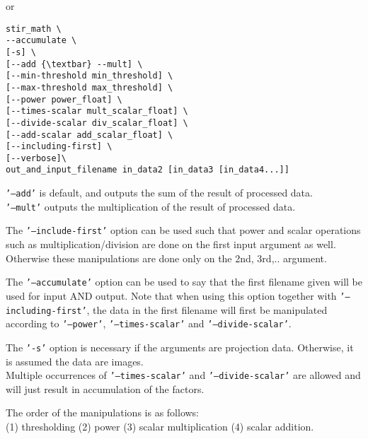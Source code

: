\documentclass{article}
\begin{document}
or

\begin{verbatim}
stir_math \
--accumulate \
[-s] \
[--add {\textbar} --mult] \
[--min-threshold min_threshold] \
[--max-threshold max_threshold] \
[--power power_float] \
[--times-scalar mult_scalar_float] \
[--divide-scalar div_scalar_float] \
[--add-scalar add_scalar_float] \
[--including-first] \
[--verbose]\
out_and_input_filename in_data2 [in_data3 [in_data4...]]
\end{verbatim}

\noindent
\texttt{'--add'} is default, and outputs the sum of the result of 
processed data.\\
\texttt{'--mult'} outputs the multiplication of the result of processed 
data.


The \texttt{'--include-first'} option can be used such that power and 
scalar operations such as multiplication/division are done on 
the first input argument as well. Otherwise these manipulations 
are done only on the 2nd, 3rd,.. argument.


The \texttt{'--accumulate'} option can be used to say that the first filename 
given will be used for input AND output. Note that when using 
this option together with \texttt{'--including-first'}, the data in the 
first filename will first be manipulated according to \texttt{'--power'}, 
\texttt{'--times-scalar'} and \texttt{'--divide-scalar'}.


The \texttt{'-s'} option is necessary if the arguments are projection 
data. Otherwise, it is assumed the data are images.\\
Multiple occurrences of \texttt{'--times-scalar'} and \texttt{'--divide-scalar'} 
are allowed and will just result in accumulation of the factors.


The order of the manipulations is as follows:\\
(1) thresholding (2) power (3) scalar multiplication (4) scalar 
addition.\\
\end{document}
